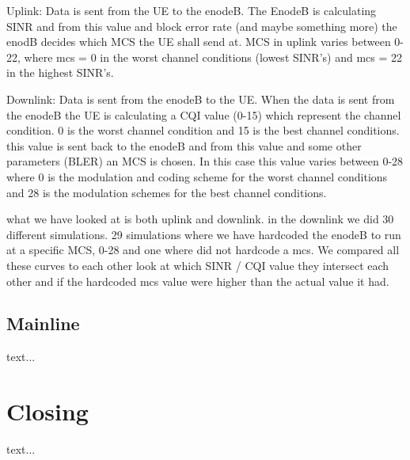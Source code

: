 \documentclass[cropmarks, frame, english]{idamasterthesis}
\begin{document}
Uplink: \newline
Data is sent from the UE to the enodeB. The EnodeB is calculating SINR and from this value and block error rate (and maybe something more) the enodB decides which MCS the UE shall send at. MCS in uplink varies between 0-22, where mcs = 0 in the worst channel conditions (lowest SINR's) and mcs = 22 in the highest SINR's. 

Downlink: \newline
Data is sent from the enodeB to the UE. When the data is sent from the enodeB the UE is calculating a CQI value (0-15) which represent the channel condition. 0 is the worst channel condition and 15 is the best channel conditions. this value is sent back to the enodeB and from this value and some other parameters (BLER) an MCS is chosen. In this case this value varies between 0-28 where 0 is the modulation and coding scheme for the worst channel conditions and 28 is the modulation schemes for the best channel conditions.

what we have looked at is both uplink and downlink. in the downlink we did 30 different simulations. 29 simulations where we have hardcoded the enodeB to run at a specific MCS, 0-28 and one where did not hardcode a mcs. We compared all these curves to each other look at which SINR / CQI value they intersect each other and if the hardcoded mcs value were higher than the actual value it had.

\section{Mainline}

text...


\chapter{Closing}

text...
\end{document}
